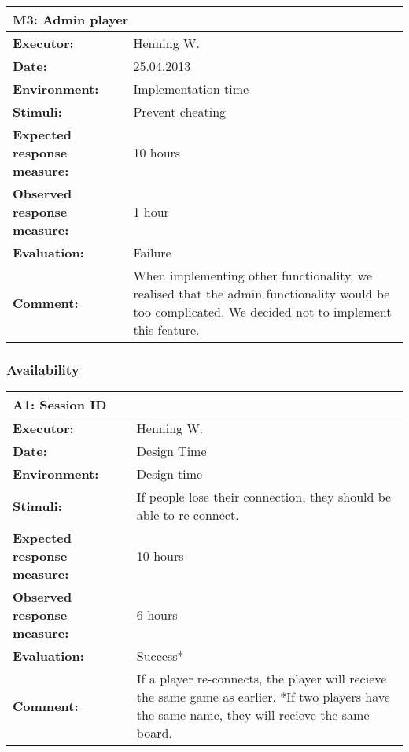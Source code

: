 \begin{tabular}{|m{}||m{}|}
\hline
\multicolumn{2}{|l|}{M3: Admin player} \\ \hline
\textbf{Executor:} & Henning W.\\ \hline
\textbf{Date:} & 25.04.2013\\ \hline
\textbf{Environment:} & Implementation time\\ \hline
\textbf{Stimuli:} & Prevent cheating\\ \hline
\textbf{Expected response measure:} & 10 hours\\ \hline
\textbf{Observed response measure:} & 1 hour\\ \hline
\textbf{Evaluation:} & Failure\\ \hline
\textbf{Comment:} & When implementing other functionality, we realised that the admin functionality would be too complicated. We decided not to implement this feature.\\ \hline
\end{tabular}


\subsubsection{Availability}

\begin{tabular}{|m{}||m{}|}
\hline
\multicolumn{2}{|l|}{A1: Session ID} \\ \hline
\textbf{Executor:} & Henning W.\\ \hline
\textbf{Date:} & Design Time\\ \hline
\textbf{Environment:} & Design time\\ \hline
\textbf{Stimuli:} & If people lose their connection, they should be able to re-connect.\\ \hline
\textbf{Expected response measure:} & 10 hours\\ \hline
\textbf{Observed response measure:} & 6 hours\\ \hline
\textbf{Evaluation:} & Success*\\ \hline
\textbf{Comment:} & If a player re-connects, the player will recieve the same game as earlier.
*If two players have the same name, they will recieve the same board.\\ \hline
\end{tabular}

